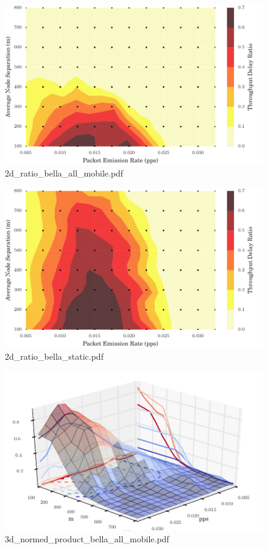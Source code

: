 \documentclass{article}
\begin{document}
\begin{figure}[h!]
\centering
\includegraphics[width=\linewidth]{2d_ratio_bella_all_mobile.pdf}
\caption{2d\_ratio\_bella\_all\_mobile.pdf}
\end{figure}




\begin{figure}[h!]
\centering
\includegraphics[width=\linewidth]{2d_ratio_bella_static.pdf}
\caption{2d\_ratio\_bella\_static.pdf}
\end{figure}




\begin{figure}[h!]
\centering
\includegraphics[width=\linewidth]{3d_normed_product_bella_all_mobile.pdf}
\caption{3d\_normed\_product\_bella\_all\_mobile.pdf}
\end{figure}
\end{document}
